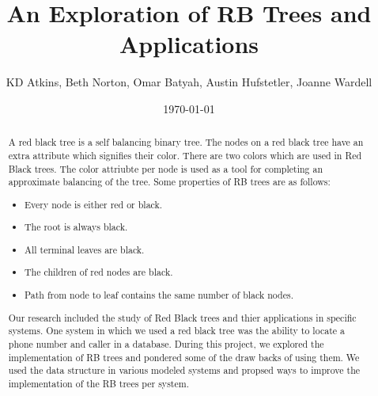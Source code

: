 \documentclass[notitlepage]{report}
\title{An Exploration of RB Trees and Applications}
\author{KD Atkins, Beth Norton, Omar Batyah, Austin Hufstetler, Joanne Wardell}
\date{\today}
\begin{document}
\maketitle
\thispagestyle{empty}

\begin{abstract}
A red black tree is a self balancing binary tree. The nodes on a red black tree have an extra attribute which signifies their color. There are two colors which are used in Red Black trees. The color attriubte per node is used as a tool for completing an approximate balancing of the tree. Some properties of RB trees are as follows: 
	\begin{itemize}
		\item Every node is either red or black.
		\item The root is always black.
		\item All terminal leaves are black.
		\item The children of red nodes are black.
		\item Path from node to leaf contains the same number of black nodes.
	\end{itemize}
Our research included the study of Red Black trees and thier applications in specific systems. One system in which we used 
a red black tree was the ability to locate a phone number and caller in a database. During this project, we explored the implementation of RB trees and pondered some of the draw backs of using them. We used the data structure in various modeled systems and propsed ways to improve the implementation of the RB trees per system. 
\end{abstract}
\end{document}
